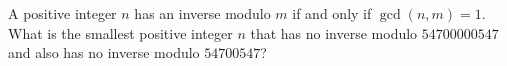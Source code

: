 A positive integer $n$ has an inverse modulo $m$ if and only if $\gcd(n,m)=1$. What is the smallest positive integer $n$ that has no inverse modulo $54700000547$ and also has no inverse modulo $54700547$?
